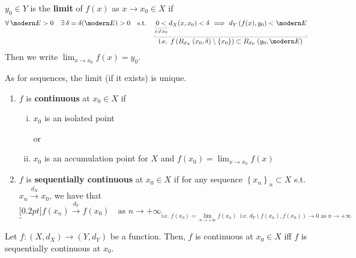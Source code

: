 \begin{defn}
$y_0\in Y$ is the \textbf{limit} of $f(x)$ as $x\to x_0\in X$ if
\begin{equation*}
\forall \Ec>0\quad \exists\delta=\delta(\Ec)>0\quad\text{s.t.}\quad \underbracket[0.2pt]{ \underbracket[0.2pt]{0<}_{x\neq x_0}d_X(x,x_0)<\delta\ \Longrightarrow\ d_Y\left( f(x),y_0 \right)<\Ec }_{\displaystyle\text{i.e. }f\left( B_{d_X}\left(x_0,\delta\right)\setminus\left\{ x_0 \right\} \right)\subset B_{d_Y}\left( y_0,\Ec \right)}
\end{equation*}
Then we write $\displaystyle\lim_{x\to x_0}f(x)=y_0$.
\end{defn}

As for sequences, the limit (if it exists) is unique.

\begin{defn}
\leavevmode
\begin{enumerate}
    \item $f$ is \textbf{continuous} at $x_0\in X$ if
    \begin{enumerate}[(i)]
        \item $x_0$ is an isolated point

        or

        \item $x_0$ is an accumulation point for $X$ and $f(x_0)=\displaystyle\lim_{x\to x_0} f(x)$
    \end{enumerate}

    \item $f$ is \textbf{sequentially continuous} at $x_0\in X$ if for any sequence $\left\{ x_n \right\}_n\subset X$ s.t. $x_n\overset{d_X}\longrightarrow x_0$, we have that
    \begin{equation*}
    \underbracket[0.2pt]{f\left( x_n \right)\overset{d_Y}\longrightarrow f\left( x_0 \right)\quad\text{as }n\to+\infty}_{\displaystyle\text{i.e. }f\left( x_0 \right)=\lim_{n\to+\infty}f(x_n)\ \text{ i.e. }d_Y\left( f\left( x_n\right),f\left( x_0 \right) \right)\to 0\text{ as }n\to+\infty}
    \end{equation*}
\end{enumerate}
\end{defn}

\begin{thm}
Let $f:\left( X,d_X \right)\to\left( Y,d_Y \right)$ be a function. Then, $f$ is continuous at $x_0\in X$ iff $f$ is sequentially continuous at $x_0$.
\end{thm}

























